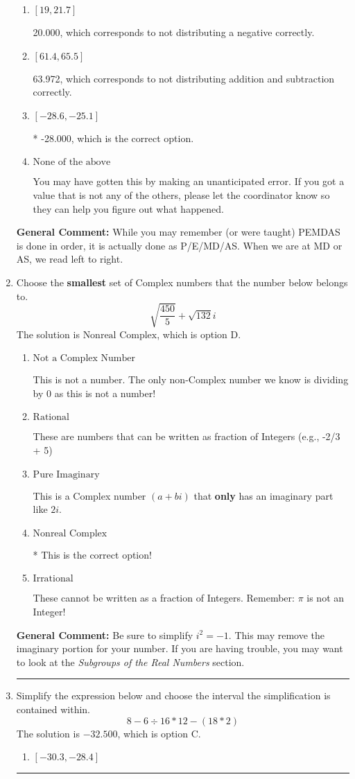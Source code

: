 \documentclass{extbook}[14pt]
\newcommand{\litem}[1]{\item #1

\rule{\textwidth}{0.4pt}}
\begin{document}
\begin{enumerate}
{\begin{enumerate}[label=\Alph*.]
 -24.028, which corresponds to an Order of Operations error: not reading left-to-right for multiplication/division.
\item \( [19, 21.7] \)

 20.000, which corresponds to not distributing a negative correctly.
\item \( [61.4, 65.5] \)

 63.972, which corresponds to not distributing addition and subtraction correctly.
\item \( [-28.6, -25.1] \)

* -28.000, which is the correct option.
\item \( \text{None of the above} \)

 You may have gotten this by making an unanticipated error. If you got a value that is not any of the others, please let the coordinator know so they can help you figure out what happened.
\end{enumerate}

\textbf{General Comment:} While you may remember (or were taught) PEMDAS is done in order, it is actually done as P/E/MD/AS. When we are at MD or AS, we read left to right.
}
\litem{
Choose the \textbf{smallest} set of Complex numbers that the number below belongs to.
\[ \sqrt{\frac{450}{5}}+\sqrt{132} i \]The solution is \( \text{Nonreal Complex} \), which is option D.\begin{enumerate}[label=\Alph*.]
\item \( \text{Not a Complex Number} \)

This is not a number. The only non-Complex number we know is dividing by 0 as this is not a number!
\item \( \text{Rational} \)

These are numbers that can be written as fraction of Integers (e.g., -2/3 + 5)
\item \( \text{Pure Imaginary} \)

This is a Complex number $(a+bi)$ that \textbf{only} has an imaginary part like $2i$.
\item \( \text{Nonreal Complex} \)

* This is the correct option!
\item \( \text{Irrational} \)

These cannot be written as a fraction of Integers. Remember: $\pi$ is not an Integer!
\end{enumerate}

\textbf{General Comment:} Be sure to simplify $i^2 = -1$. This may remove the imaginary portion for your number. If you are having trouble, you may want to look at the \textit{Subgroups of the Real Numbers} section.
}
\litem{
Simplify the expression below and choose the interval the simplification is contained within.
\[ 8 - 6 \div 16 * 12 - (18 * 2) \]The solution is \( -32.500 \), which is option C.\begin{enumerate}[label=\Alph*.]
\item \( [-30.3, -28.4] \)


\end{enumerate}}
\end{enumerate}
\end{document}
